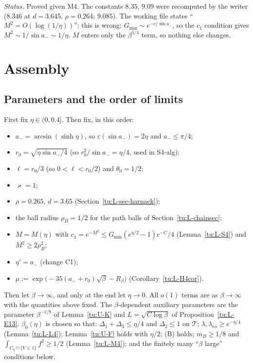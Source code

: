 \noindent\emph{Status.} Proved given M4. The constants $8.35$, $9.09$ were recomputed by the writer ($8.346$ at $d=3.645$, $\rho=0.264$;
$9.085$). The working file states ``$M^2=O(\log(1/\eta))$''; this is wrong: $G_{\min}\sim e^{-c/\sin a_-}$, so the $c_1$ condition
gives $M^2\sim1/\sin a_-\sim1/\eta$. $M$ enters only the $\beta^{1/4}$ term, so nothing else changes.

\section{Assembly}\label{tu:L-sec-assembly}

\subsection{Parameters and the order of limits}
First fix $\eta\in(0,0.4]$. Then fix, in this order:
\begin{itemize}
\item $a_-=\arcsin(\sinh\eta)$, so $\varepsilon(\sin a_-)=2\eta$ and $a_-\le\pi/4$;
\item $r_0=\sqrt{\eta\sin a_-/4}$ (so $r_0^2/\sin a_-=\eta/4$, used in S4-alg);
\item $\ell=r_0/3$ (so $0<\ell<r_0/2$) and $\theta_0=1/2$;
\item $\varkappa=1$;
\item $\rho=0.265$, $d=3.65$ (Section~\ref{tu:L-sec-harnack});
\item the ball radius $\rho_B=1/2$ for the path balls of Section~\ref{tu:L-chainsec};
\item $M=M(\eta)$ with $c_1=e^{-M^2}\le G_{\min}(e^{\eta/2}-1)e^{-C}/4$ (Lemma~\ref{tu:L-S4}) and $M^2\ge2\rho_B^2$;
\item $\eta'=a_-$ (change C1);
\item $\mu:=\exp\big(-35(a_-+r_0)\sqrt\beta-R_\beta\big)$ (Corollary~\ref{tu:L-H4cor}).
\end{itemize}
Then let $\beta\to\infty$, and only at the end let $\eta\to0$. All $o(1)$ terms are as $\beta\to\infty$ with the quantities above
fixed. The $\beta$-dependent auxiliary parameters are the parameter $\beta^{-1/8}$ of Lemma~\ref{tu:U-K} and $L=\sqrt{C\log\beta}$ of
Proposition~\ref{tu:L-E13}. $\beta_0(\eta)$ is chosen so that: $\Delta_1+\Delta_3\le\eta/4$ and $\Delta_2\le1$ on $\mathcal T$;
$\lambda,\lambda_{eo}\ge e^{-\eta/4}$ (Lemma~\ref{tu:L-L4}); Lemma~\ref{tu:U-F} holds with $\eta/2$; (B) holds; $m_B\ge1/8$ and
$\int_{C_\eta\cap\{V\le1\}}f^2\ge1/2$ (Lemma~\ref{tu:L-M4}); and the finitely many ``$\beta$ large'' conditions below.

